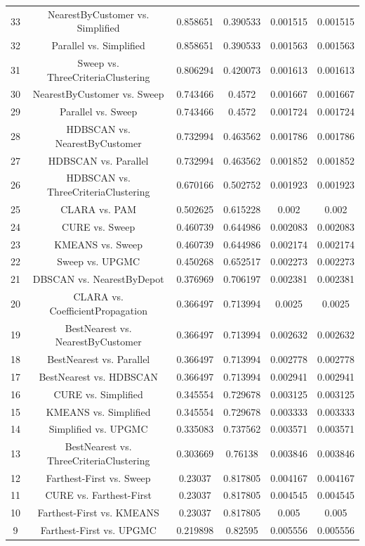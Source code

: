 \documentclass[a4paper,10pt]{article}
\begin{document}
\begin{landscape}
\begin{table}[!htp]
\begin{tabular}{cccccc}
33&NearestByCustomer vs. Simplified&0.858651&0.390533&0.001515&0.001515\\
32&Parallel vs. Simplified&0.858651&0.390533&0.001563&0.001563\\
31&Sweep vs. ThreeCriteriaClustering&0.806294&0.420073&0.001613&0.001613\\
30&NearestByCustomer vs. Sweep&0.743466&0.4572&0.001667&0.001667\\
29&Parallel vs. Sweep&0.743466&0.4572&0.001724&0.001724\\
28&HDBSCAN vs. NearestByCustomer&0.732994&0.463562&0.001786&0.001786\\
27&HDBSCAN vs. Parallel&0.732994&0.463562&0.001852&0.001852\\
26&HDBSCAN vs. ThreeCriteriaClustering&0.670166&0.502752&0.001923&0.001923\\
25&CLARA vs. PAM&0.502625&0.615228&0.002&0.002\\
24&CURE vs. Sweep&0.460739&0.644986&0.002083&0.002083\\
23&KMEANS vs. Sweep&0.460739&0.644986&0.002174&0.002174\\
22&Sweep vs. UPGMC&0.450268&0.652517&0.002273&0.002273\\
21&DBSCAN vs. NearestByDepot&0.376969&0.706197&0.002381&0.002381\\
20&CLARA vs. CoefficientPropagation&0.366497&0.713994&0.0025&0.0025\\
19&BestNearest vs. NearestByCustomer&0.366497&0.713994&0.002632&0.002632\\
18&BestNearest vs. Parallel&0.366497&0.713994&0.002778&0.002778\\
17&BestNearest vs. HDBSCAN&0.366497&0.713994&0.002941&0.002941\\
16&CURE vs. Simplified&0.345554&0.729678&0.003125&0.003125\\
15&KMEANS vs. Simplified&0.345554&0.729678&0.003333&0.003333\\
14&Simplified vs. UPGMC&0.335083&0.737562&0.003571&0.003571\\
13&BestNearest vs. ThreeCriteriaClustering&0.303669&0.76138&0.003846&0.003846\\
12&Farthest-First vs. Sweep&0.23037&0.817805&0.004167&0.004167\\
11&CURE vs. Farthest-First&0.23037&0.817805&0.004545&0.004545\\
10&Farthest-First vs. KMEANS&0.23037&0.817805&0.005&0.005\\
9&Farthest-First vs. UPGMC&0.219898&0.82595&0.005556&0.005556\\

\end{tabular}
\end{table}
\end{landscape}
\end{document}
